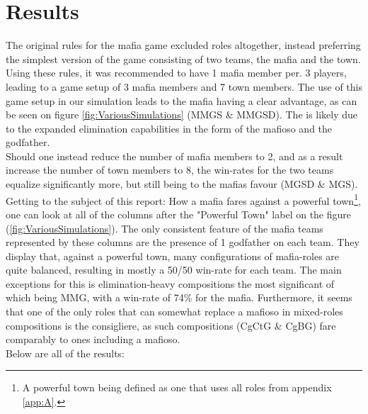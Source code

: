 \section{Results}\label{sec:results}
The original rules for the mafia game excluded roles altogether, instead 
preferring the simplest version of the game consisting of two teams, the mafia 
and the town. Using these rules\cite{MafiaRules}, it was recommended to have 1 mafia member per. 
3 players, leading to a game setup of 3 mafia members and 7 town 
members. The use of this game setup in our simulation leads to the 
mafia having a clear advantage, as can be seen on figure 
\ref{fig:VariousSimulations} (MMGS \& MMGSD). The is likely due to the expanded elimination 
capabilities in the form of the mafioso and the godfather. \\
Should one instead reduce the number of mafia members to 2, and as a result 
increase the number of town members to 8, the win-rates for the two teams 
equalize significantly more, but still being to the mafias favour (MGSD \& 
MGS).\\
Getting to the subject of this report: How a mafia fares against a powerful 
town\footnote{A powerful town being defined as one that uses all roles 
from 
appendix \ref{app:A}.}, one can look at all of the columns after the "Powerful 
Town" label on the figure (\ref{fig:VariousSimulations}). The only consistent 
feature of the mafia teams represented by these columns are the presence of 1 
godfather on each team. They display that, against a powerful town, many 
configurations of mafia-roles are quite balanced, resulting in mostly a 50/50 
win-rate for each team. The main exceptions for this is elimination-heavy compositions the most significant of which being MMG, with a 
win-rate of 74\% for the mafia. Furthermore, it seems that one of the only 
roles that can somewhat replace a mafioso in mixed-roles compositions is the 
consigliere, as such compositions (CgCtG \& CgBG) fare comparably to ones 
including a mafioso. \\
Below are all of the results:
